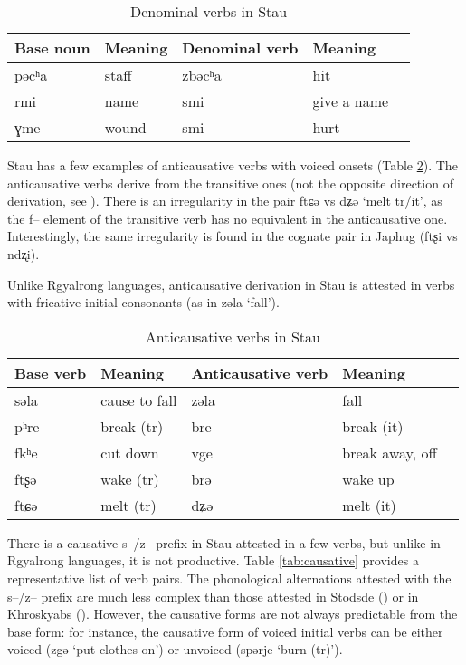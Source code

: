 \documentclass[oneside,a4paper,11pt]{article}
\newcommand{\ipa}[1]{{\phon #1}} %
\begin{document}
 \begin{table}[H]
 \caption{Denominal verbs in Stau} \label{tab:denominal} \centering 
\begin{tabular}{lllll}
\toprule
Base noun & Meaning & Denominal verb & Meaning \\
\midrule
\ipa{pəcʰa} & staff&\ipa{zbəcʰa} & hit \\
\ipa{rmi} &name &\ipa{smi} &give a name \\
\ipa{ɣme} &wound &\ipa{smi} & hurt \\
\bottomrule
\end{tabular}
\end{table}
 
 
 Stau has a few examples of anticausative verbs with voiced onsets (Table \ref{tab:anticausative}). The anticausative verbs derive from the transitive ones (not the opposite direction of derivation, see \citealt{jacques12demotion}). There is an irregularity in the pair \ipa{ftɕə} vs \ipa{dʑə} `melt tr/it', as the \ipa{f--} element of the transitive verb has no equivalent in the anticausative one. Interestingly, the same irregularity is found in the cognate pair in Japhug (\ipa{ftʂi} vs \ipa{ndʐi}).
 
Unlike Rgyalrong languages, anticausative derivation in Stau is attested in verbs with fricative initial consonants (as in \ipa{zəla}  `fall').
 
  \begin{table}[H]
 \caption{Anticausative verbs in Stau} \label{tab:anticausative} \centering 
\begin{tabular}{lllll}
\toprule
Base verb & Meaning & Anticausative verb & Meaning \\
\midrule
 \ipa{səla} &cause to fall & \ipa{zəla}  & fall \\
\ipa{pʰre}   &break (tr) &\ipa{bre}   & break (it) \\
  \ipa{fkʰe} & cut down & \ipa{vge} & break away, off \\
\ipa{ftʂə}& wake (tr) & \ipa{brə}& wake up\\
\ipa{ftɕə} &melt (tr) &\ipa{dʑə} &melt (it)\\
 \bottomrule
\end{tabular}
\end{table}
 
There is a causative \ipa{s--/z--} prefix in Stau attested in a few verbs, but unlike in Rgyalrong languages, it is not productive. Table \ref{tab:causative} provides a representative list of verb pairs. The phonological alternations attested with the \ipa{s--/z--} prefix are much less complex than those attested in Stodsde (\citealt{jackson07shangzhai}) or in Khroskyabs (\citealt{lai14caus}). However, the causative forms are not always predictable from the base form: for instance, the causative form of voiced initial verbs can be either voiced (\ipa{zgə} `put clothes on') or unvoiced (\ipa{spərje} `burn (tr)').
 
\end{document}
